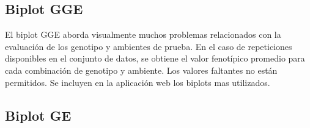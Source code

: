 \subsection{Biplot GGE}
El biplot GGE aborda visualmente muchos problemas relacionados con la evaluación de los genotipo y ambientes de prueba. En el caso de repeticiones disponibles en el conjunto de datos, se obtiene el valor fenotípico promedio para cada combinación de genotipo y ambiente. Los valores faltantes no están permitidos. Se incluyen en la aplicación web los biplots mas utilizados.


\subsection{Biplot GE}

